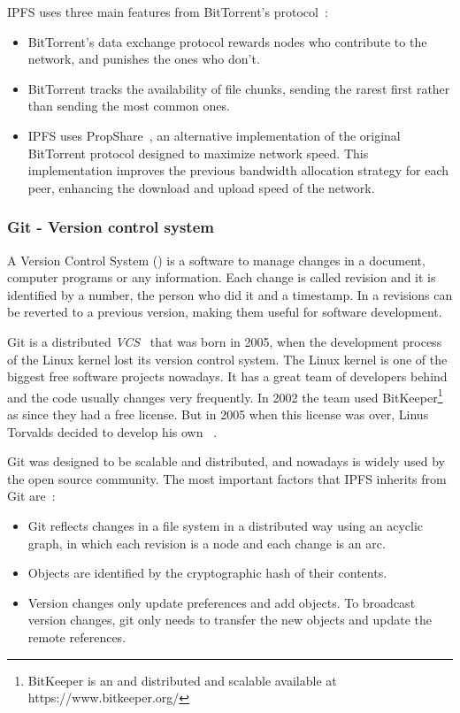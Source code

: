 IPFS uses three main features from BitTorrent's protocol~\cite{benet2014ipfs}:
\begin{itemize}
\item BitTorrent's data exchange protocol rewards nodes who contribute to the
  network, and punishes the ones who don't.
\item BitTorrent tracks the availability of file chunks, sending the rarest
  first rather than sending the most common ones.
\item IPFS uses PropShare~\cite{levin2008bittorrent}, an alternative
  implementation of the original BitTorrent protocol designed to maximize
  network speed. This implementation improves the previous bandwidth allocation
  strategy for each peer, enhancing the download and upload speed of the
  network.
\end{itemize}

\subsubsection*{Git - Version control system}
\label{tech:sec:ipfs:git}

A Version Control System () is a software to manage changes in a
document, computer programs or any information. Each change is called revision
and it is identified by a number, the person who did it and a timestamp. In a
 revisions can be reverted to a previous version, making them useful for
software development.

Git is a distributed \emph{VCS}~\cite{torvalds2010git} that was born in 2005,
when the development process of the Linux kernel lost its version control
system. The Linux kernel is one of the biggest free software projects nowadays.
It has a great team of developers behind and the code usually changes very
frequently. In 2002 the team used BitKeeper\footnote{BitKeeper is an and
  distributed and scalable  available at https://www.bitkeeper.org/} as
 since they had a free license. But in 2005 when this license was over,
Linus Torvalds decided to develop his own ~\cite{spinellis2005version}.

Git was designed to be scalable and distributed, and nowadays is widely used by
the open source community. The most important factors that IPFS inherits from
Git are~\cite{benet2014ipfs}:

\begin{itemize}
\item Git reflects changes in a file system in a distributed way using an
  acyclic graph, in which each revision is a node and each change is an arc.
\item Objects are identified by the cryptographic hash of their contents.
\item Version changes only update preferences and add objects. To broadcast
  version changes, git only needs to transfer the new objects and update the
  remote references.
\end{itemize}

